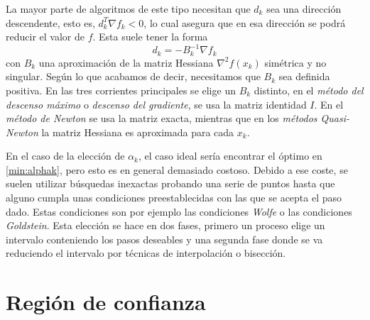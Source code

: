 \documentclass[11pt,a4paper]{book}
\theoremstyle{definition}
\theoremstyle{remark}
\begin{document}
La mayor parte de algoritmos de este tipo necesitan que $d_k$ sea una dirección descendente, esto es, $d_k^T \nabla f_k < 0$,
lo cual asegura que en esa dirección se podrá reducir el valor de $f$. Esta suele tener la forma
\begin{equation}
	d_k = -B_k^{-1} \nabla f_k
\end{equation}
con $B_k$ una aproximación de la matriz Hessiana $\nabla^2 f(x_k)$ simétrica y no singular. Según lo que acabamos de decir, necesitamos que $B_k$ sea definida positiva. En las tres corrientes principales se elige un $B_k$ distinto, en el \textit{método del descenso máximo} o \textit{descenso del gradiente}, se usa la matriz identidad $I$.
En el \textit{método de Newton} se usa la matriz exacta, mientras que en los \textit{métodos Quasi-Newton} la matriz Hessiana es aproximada para cada $x_k$.

En el caso de la elección de $\alpha_k$, el caso ideal sería encontrar el óptimo en \ref{min:alphak}, pero esto es en general demasiado costoso.
Debido a ese coste, se suelen utilizar búsquedas inexactas probando una serie de puntos hasta que alguno cumpla unas condiciones preestablecidas con las que se acepta el paso dado.
Estas condiciones son por ejemplo las condiciones \textit{Wolfe} o las condiciones \textit{Goldstein}.
Esta elección se hace en dos fases, primero un proceso elige un intervalo conteniendo los pasos deseables y una segunda fase donde se va reduciendo el intervalo por técnicas de interpolación o bisección. %



\section{Región de confianza}
\end{document}
